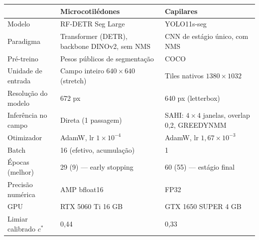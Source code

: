 \documentclass[border=12pt]{standalone}
\begin{document}
\begin{tabular}{L{4.0cm} L{6.2cm} L{6.2cm}}
\toprule
 & \textbf{\color{micro}Microcotilédones} & \textbf{\color{cap}Capilares} \\
\midrule
{}
Modelo & RF-DETR Seg Large & YOLO11s-seg \\
Paradigma & Transformer (DETR), backbone DINOv2, sem NMS & CNN de estágio único, com NMS \\
Pré-treino & Pesos públicos de segmentação & COCO \\
Unidade de entrada & Campo inteiro $640\times640$ (stretch) & Tiles nativos $1380\times1032$ \\
Resolução do modelo & 672 px & 640 px (letterbox) \\
Inferência no campo & Direta (1 passagem) & SAHI: $4\times4$ janelas, overlap 0,2, GREEDYNMM \\
Otimizador & AdamW, lr $1\times10^{-4}$ & AdamW, lr $1{,}67\times10^{-3}$ \\
Batch & 16 (efetivo, acumulação) & 1 \\
Épocas (melhor) & 29 (9) --- early stopping & 60 (55) --- estágio final \\
Precisão numérica & AMP bfloat16 & FP32 \\
GPU & RTX 5060 Ti 16 GB & GTX 1650 SUPER 4 GB \\
Limiar calibrado $c^{*}$ & 0,44 & 0,33 \\
\bottomrule
\end{tabular}
\end{document}
